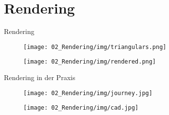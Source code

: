 \section{Rendering}
	
	\begin{frame}[plain, c]
		
	\begin{center}
		\Huge Rendering
	\end{center}
	
	\begin{figure}
				\centering
				\begin{minipage}{.4\paperwidth}
					\centering
					\texttt{[image: 02\_Rendering/img/triangulars.png]}
				\end{minipage}%
				\begin{minipage}{.4\paperwidth}
					\centering
					\texttt{[image: 02\_Rendering/img/rendered.png]}
				\end{minipage}
		\end{figure}

		
	\end{frame}
	

		
		
	
	\begin{frame}{\Huge{Rendering in der Praxis}}
		
		\begin{figure}
				\centering
				\begin{minipage}{.4\paperwidth}
					\centering
					\texttt{[image: 02\_Rendering/img/journey.jpg]}
				\end{minipage}%
				\begin{minipage}{.5\paperwidth}
					\centering
					\texttt{[image: 02\_Rendering/img/cad.jpg]}
				\end{minipage}
		\end{figure}
		
		
\end{frame}
	
